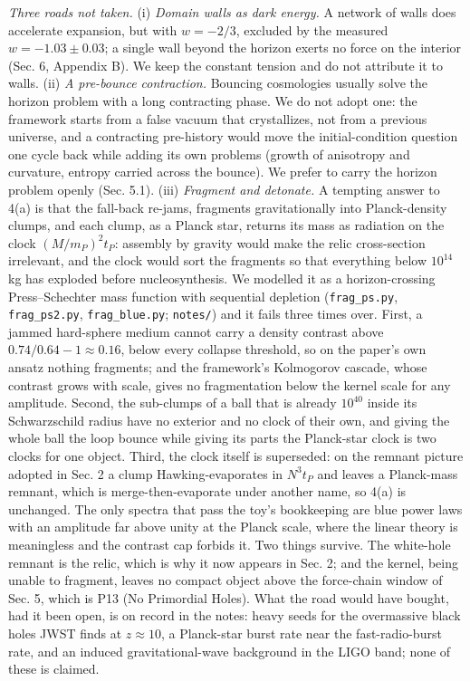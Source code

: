 \documentclass[
  11pt,
]{article}
\begin{document}
\emph{Three roads not taken.} (i) \emph{Domain walls as dark energy.} A
network of walls does accelerate expansion, but with \(w = -2/3\),
excluded by the measured \(w = -1.03 \pm 0.03\); a single wall beyond
the horizon exerts no force on the interior (Sec. 6, Appendix B). We
keep the constant tension and do not attribute it to walls. (ii) \emph{A
pre-bounce contraction.} Bouncing cosmologies usually solve the horizon
problem with a long contracting phase. We do not adopt one: the
framework starts from a false vacuum that crystallizes, not from a
previous universe, and a contracting pre-history would move the
initial-condition question one cycle back while adding its own problems
(growth of anisotropy and curvature, entropy carried across the bounce).
We prefer to carry the horizon problem openly (Sec. 5.1). (iii)
\emph{Fragment and detonate.} A tempting answer to 4(a) is that the
fall-back re-jams, fragments gravitationally into Planck-density clumps,
and each clump, as a Planck star, returns its mass as radiation on the
clock \((M/m_P)^2 t_P\): assembly by gravity would make the relic
cross-section irrelevant, and the clock would sort the fragments so that
everything below \(10^{14}\) kg has exploded before nucleosynthesis. We
modelled it as a horizon-crossing Press--Schechter mass function with
sequential depletion (\texttt{frag\_ps.py}, \texttt{frag\_ps2.py},
\texttt{frag\_blue.py}; \texttt{notes/}) and it fails three times over.
First, a jammed hard-sphere medium cannot carry a density contrast above
\(0.74/0.64 - 1 \approx 0.16\), below every collapse threshold, so on
the paper's own ansatz nothing fragments; and the framework's Kolmogorov
cascade, whose contrast grows with scale, gives no fragmentation below
the kernel scale for any amplitude. Second, the sub-clumps of a ball
that is already \(10^{40}\) inside its Schwarzschild radius have no
exterior and no clock of their own, and giving the whole ball the loop
bounce while giving its parts the Planck-star clock is two clocks for
one object. Third, the clock itself is superseded: on the remnant
picture adopted in Sec. 2 a clump Hawking-evaporates in \(N^3 t_P\) and
leaves a Planck-mass remnant, which is merge-then-evaporate under
another name, so 4(a) is unchanged. The only spectra that pass the toy's
bookkeeping are blue power laws with an amplitude far above unity at the
Planck scale, where the linear theory is meaningless and the contrast
cap forbids it. Two things survive. The white-hole remnant is the relic,
which is why it now appears in Sec. 2; and the kernel, being unable to
fragment, leaves no compact object above the force-chain window of Sec.
5, which is P13 (No Primordial Holes). What the road would have bought,
had it been open, is on record in the notes: heavy seeds for the
overmassive black holes JWST finds at \(z \approx 10\), a Planck-star
burst rate near the fast-radio-burst rate, and an induced
gravitational-wave background in the LIGO band; none of these is
claimed.
\end{document}

